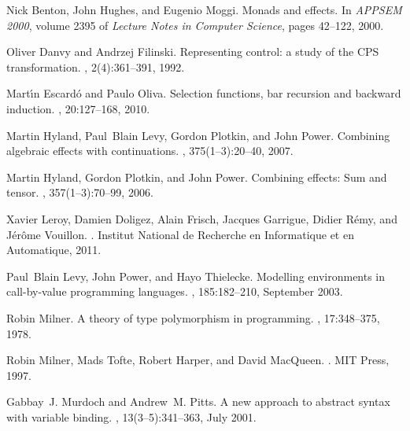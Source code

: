 \documentclass[12pt]{article}
\begin{document}
\begin{thebibliography}{10}

Nick Benton, John Hughes, and Eugenio Moggi.
\newblock Monads and effects.
\newblock In {\em APPSEM 2000}, volume 2395 of {\em Lecture Notes in Computer
  Science}, pages 42--122, 2000.

Oliver Danvy and Andrzej Filinski.
\newblock Representing control: a study of the {CPS} transformation.
, 2(4):361--391,
  1992.

Mart{\'\i}n Escard{\'o} and Paulo Oliva.
\newblock Selection functions, bar recursion and backward induction.
, 20:127--168, 2010.

Martin Hyland, Paul~Blain Levy, Gordon Plotkin, and John Power.
\newblock Combining algebraic effects with continuations.
, 375(1--3):20--40, 2007.

Martin Hyland, Gordon Plotkin, and John Power.
\newblock Combining effects: Sum and tensor.
, 357(1--3):70--99, 2006.

Xavier Leroy, Damien Doligez, Alain Frisch, Jacques Garrigue, Didier R\'emy,
  and J\'er\^ome Vouillon.
.
\newblock Institut National de Recherche en Informatique et en Automatique,
  2011.

Paul~Blain Levy, John Power, and Hayo Thielecke.
\newblock Modelling environments in call-by-value programming languages.
, 185:182--210, September 2003.

Robin Milner.
\newblock A theory of type polymorphism in programming.
, 17:348--375, 1978.

Robin Milner, Mads Tofte, Robert Harper, and David MacQueen.
.
\newblock MIT Press, 1997.

Gabbay~J. Murdoch and Andrew~M. Pitts.
\newblock A new approach to abstract syntax with variable binding.
, 13(3--5):341--363, July 2001.


\end{thebibliography}
\end{document}
